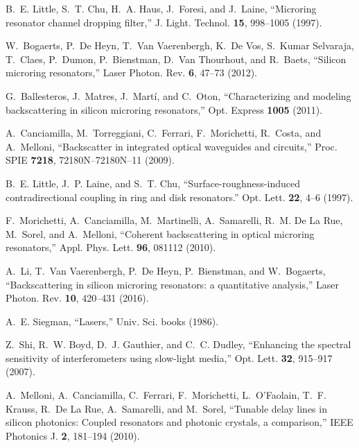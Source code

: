 \documentclass[10pt]{article}
\begin{document}
\begin{thebibliography}{10}
\newcommand{\enquote}[1]{``#1''}

B.~E. Little, S.~T. Chu, H.~A. Haus, J.~Foresi, and J.~Laine,
  \enquote{{Microring resonator channel dropping filter},} J. Light. Technol.
  \textbf{15}, 998--1005 (1997).

W.~Bogaerts, P.~{De Heyn}, T.~{Van Vaerenbergh}, K.~{De Vos}, S.~{Kumar
  Selvaraja}, T.~Claes, P.~Dumon, P.~Bienstman, D.~{Van Thourhout}, and
  R.~Baets, \enquote{{Silicon microring resonators},} Laser Photon. Rev.
  \textbf{6}, 47--73 (2012).

G.~Ballesteros, J.~Matres, J.~Mart{\'{i}}, and C.~Oton,
  \enquote{{Characterizing and modeling backscattering in silicon microring
  resonators},} Opt. Express \textbf{1005} (2011).

A.~Canciamilla, M.~Torreggiani, C.~Ferrari, F.~Morichetti, R.~Costa, and
  A.~Melloni, \enquote{{Backscatter in integrated optical waveguides and
  circuits},} Proc. SPIE \textbf{7218}, 72180N--72180N--11 (2009).

B.~E. Little, J.~P. Laine, and S.~T. Chu, \enquote{{Surface-roughness-induced
  contradirectional coupling in ring and disk resonators.}} Opt. Lett.
  \textbf{22}, 4--6 (1997).

F.~Morichetti, A.~Canciamilla, M.~Martinelli, A.~Samarelli, R.~M. {De La Rue},
  M.~Sorel, and A.~Melloni, \enquote{{Coherent backscattering in optical
  microring resonators},} Appl. Phys. Lett. \textbf{96}, 081112 (2010).

A.~Li, T.~{Van Vaerenbergh}, P.~{De Heyn}, P.~Bienstman, and W.~Bogaerts,
  \enquote{{Backscattering in silicon microring resonators: a quantitative
  analysis},} Laser Photon. Rev. \textbf{10}, 420--431 (2016).

A.~E. Siegman, \enquote{{Lasers},} Univ. Sci. books  (1986).

Z.~Shi, R.~W. Boyd, D.~J. Gauthier, and C.~C. Dudley, \enquote{{Enhancing the
  spectral sensitivity of interferometers using slow-light media},} Opt. Lett.
  \textbf{32}, 915--917 (2007).

A.~Melloni, A.~Canciamilla, C.~Ferrari, F.~Morichetti, L.~O'Faolain, T.~F.
  Krauss, R.~{De La Rue}, A.~Samarelli, and M.~Sorel, \enquote{{Tunable delay
  lines in silicon photonics: Coupled resonators and photonic crystals, a
  comparison},} IEEE Photonics J. \textbf{2}, 181--194 (2010).


\end{thebibliography}
\end{document}
